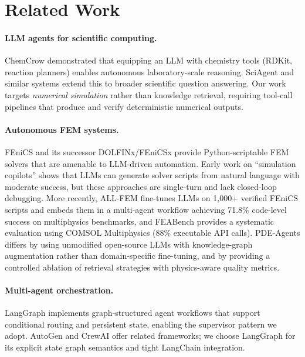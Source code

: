 \documentclass[twocolumn]{article}
\begin{document}
\section{Related Work}
\label{sec:related}

\paragraph{LLM agents for scientific computing.}
ChemCrow \citep{bran2023chemcrow} demonstrated that equipping an LLM with
chemistry tools (RDKit, reaction planners) enables autonomous laboratory-scale
reasoning.  SciAgent \citep{ma2024sciagent} and similar systems extend this
to broader scientific question answering.  Our work targets \emph{numerical
simulation} rather than knowledge retrieval, requiring tool-call pipelines that
produce and verify deterministic numerical outputs.

\paragraph{Autonomous FEM systems.}
FEniCS \citep{logg2012fenics} and its successor DOLFINx/FEniCSx
\citep{barrata2023dolfinx} provide Python-scriptable FEM solvers that are
amenable to LLM-driven automation.  Early work on ``simulation copilots''
\citep{bauer2023llm, jiang2024llm} shows that LLMs can generate solver
scripts from natural language with moderate success, but these approaches are
single-turn and lack closed-loop debugging.  More recently, ALL-FEM
\citep{deotale2026allfem} fine-tunes LLMs on 1{,}000+ verified FEniCS scripts
and embeds them in a multi-agent workflow achieving 71.8\% code-level success
on multiphysics benchmarks, and FEABench \citep{mudur2025feabench} provides a
systematic evaluation using COMSOL Multiphysics (88\% executable API calls).
PDE-Agents differs by using unmodified open-source LLMs with
knowledge-graph augmentation rather than domain-specific fine-tuning, and by
providing a controlled ablation of retrieval strategies with physics-aware
quality metrics.

\paragraph{Multi-agent orchestration.}
LangGraph \citep{langgraph2024} implements graph-structured agent workflows
that support conditional routing and persistent state, enabling the supervisor
pattern we adopt.  AutoGen \citep{wu2023autogen} and CrewAI \citep{crewai2024}
offer related frameworks; we choose LangGraph for its explicit
state graph semantics and tight LangChain integration.
\end{document}
